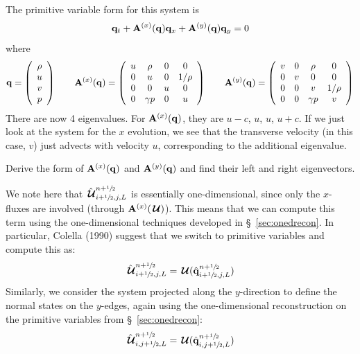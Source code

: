 The primitive variable form for this system is
\begin{equation}
{\bf q}_t + {\bf A}^{(x)}({\bf q}) {\bf q}_x + {\bf A}^{(y)}({\bf q}) {\bf q}_y = 0
\end{equation}
where
\begin{equation}
\qb = \left ( \begin{array}{c} \rho \\ u \\ v \\ p \end{array} \right )
%
\qquad
\Ab^{(x)}(\qb) = \left ( \begin{array}{cccc} u  & \rho     & 0 &  0 \\
                                         0  &  u       & 0 &  1/\rho \\
                                         0  &  0       & u &  0 \\
                                         0  & \gamma p & 0 &  u \end{array} \right )
\qquad
\Ab^{(y)}(\qb) = \left ( \begin{array}{cccc} v  & 0 & \rho &  0 \\
                                         0  & v & 0    &  0 \\
                                         0  & 0 & v    &  1/\rho \\
                                         0  & 0 & \gamma p & v \end{array} \right )
\end{equation}
There are now 4 eigenvalues.  For ${\bf A}^{(x)}({\bf q})$, they are $u-c$, $u$,
$u$, $u+c$.  If we just look at the system for the $x$ evolution, we
see that the transverse velocity (in this case, $v$) just advects with
velocity $u$, corresponding to the additional eigenvalue.
\begin{exercise}
{
Derive the form of ${\bf A}^{(x)}({\bf q})$ and ${\bf A}^{(y)}({\bf q})$ and find their left and right eigenvectors.}
\end{exercise}

We note here that $\hat{{\,\boldsymbol{\mathcal{U}}}}_{i+{\sfrac{1}{2}},j,L}^{n+{\sfrac{1}{2}}}$ is essentially
one-dimensional, since only the $x$-fluxes are involved (through
${\bf A}^{(x)}({\,\boldsymbol{\mathcal{U}}})$).  This means that we can compute this term using the
one-dimensional techniques developed in \S~\ref{sec:onedrecon}.  In
particular, Colella (1990) suggest that we switch to primitive variables
and compute this as:
\begin{equation}
\hat{{\,\boldsymbol{\mathcal{U}}}}_{i+{\sfrac{1}{2}},j,L}^{n+{\sfrac{1}{2}}} = {\,\boldsymbol{\mathcal{U}}}(\hat{{\bf q}}_{i+{\sfrac{1}{2}},j,L}^{n+{\sfrac{1}{2}}})
\end{equation}
Similarly, we consider the system projected along the $y$-direction to
define the normal states on the $y$-edges, again using the one-dimensional
reconstruction on the primitive variables from \S~\ref{sec:onedrecon}:
\begin{equation}
\hat{{\,\boldsymbol{\mathcal{U}}}}_{i,j+{\sfrac{1}{2}},L}^{n+{\sfrac{1}{2}}} = {\,\boldsymbol{\mathcal{U}}}(\hat{{\bf q}}_{i,j+{\sfrac{1}{2}},L}^{n+{\sfrac{1}{2}}})
\end{equation}

